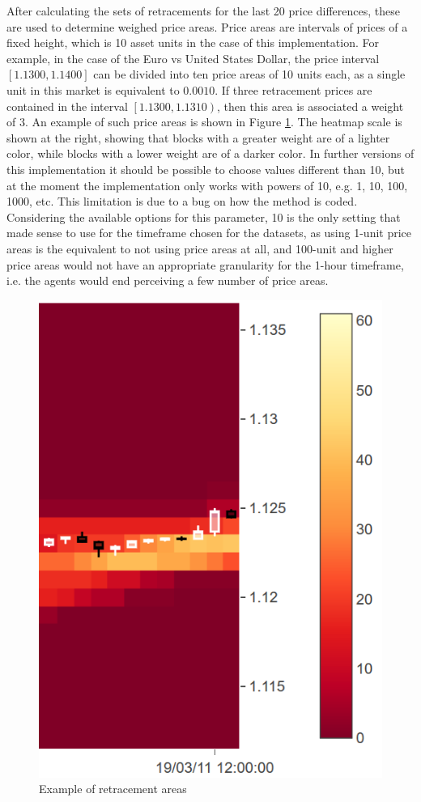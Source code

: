 After calculating the sets of retracements for the last 20 price differences,
these are used to determine weighed price areas. Price areas are intervals of
prices of a fixed height, which is 10 asset units in the case of this
implementation. For example, in the case of the Euro vs United States Dollar,
the price interval $[1.1300, 1.1400]$ can be divided into ten price areas of 10
units each, as a single unit in this market is equivalent to $0.0010$. If three
retracement prices are contained in the interval $\left[1.1300, 1.1310\right)$, then
  this area is associated a weight of $3$. An example of such price areas is
  shown in Figure \ref{figure:example-of-retracement-areas}. The heatmap scale
  is shown at the right, showing that blocks with a greater weight are of a
  lighter color, while blocks with a lower weight are of a darker color. In
  further versions of this implementation it should be possible to choose values
  different than 10, but at the moment the implementation only works with powers
  of 10, e.g. 1, 10, 100, 1000, etc. This limitation is due to a bug on how the
  method is coded. Considering the available options for this parameter, 10 is
  the only setting that made sense to use for the timeframe chosen for the
  datasets, as using 1-unit price areas is the equivalent to not using price
  areas at all, and 100-unit and higher price areas would not have an
  appropriate granularity for the 1-hour timeframe, i.e. the agents would end
  perceiving a few number of price areas.

\begin{figure}
\centering
\includegraphics[height=0.6\textwidth]{img/retracement-areas.png}
\caption{Example of retracement areas}
\label{figure:example-of-retracement-areas}
\end{figure}

